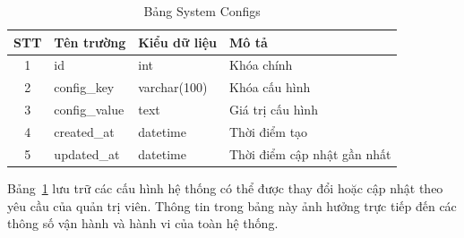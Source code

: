\documentclass[../DoAn.tex]{subfiles}
\begin{document}
\begin{table}[H]
\centering
\begin{tabular}{|c|l|l|l|}
\hline
\textbf{STT} & \textbf{Tên trường}   & \textbf{Kiểu dữ liệu} & \textbf{Mô tả}                              \\ \hline
1            & id                    & int                  & Khóa chính               \\ \hline
2            & config\_key           & varchar(100)         & Khóa cấu hình                               \\ \hline
3            & config\_value         & text                 & Giá trị cấu hình                            \\ \hline
4            & created\_at           & datetime             & Thời điểm tạo                               \\ \hline
5            & updated\_at           & datetime             & Thời điểm cập nhật gần nhất                 \\ \hline
\end{tabular}
\caption{Bảng System Configs}
\label{tab:system_configs}
\end{table}

Bảng~\ref{tab:system_configs} lưu trữ các cấu hình hệ thống có thể được thay đổi hoặc cập nhật theo yêu cầu của quản trị viên. Thông tin trong bảng này ảnh hưởng trực tiếp đến các thông số vận hành và hành vi của toàn hệ thống.
\end{document}
